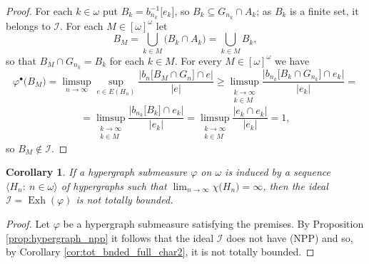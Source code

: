 \documentclass[a4paper,11pt,fleqn]{amsart}
\newtheorem{corollary}[theorem]{Corollary}
\theoremstyle{definition}
\theoremstyle{remark}
\numberwithin{equation}{section}
\newcommand{\N}{\mathbb{N}}
\newcommand{\iI}{\mathcal{I}}
\newcommand{\pP}{\mathcal{P}}
\DeclareMathOperator{\exh}{Exh}
\newcommand{\rstr}{\restriction}
\newcommand{\sm}{\setminus}
\newcommand{\sub}{\subseteq}
\newcommand{\seqn}[1]{\big\langle#1\colon\ n\io\big\rangle}
\newcommand{\ctblsub}[1]{\left[#1\right]^\omega}
\newcommand{\io}{\in\omega}%
\newcommand{\cso}{\ctblsub{\omega}}%
\begin{document}
\begin{proof}
    For each $k\io$ put $B_k=b_{n_k}^{-1}\big[e_k\big]$, so $B_k\sub G_{n_k}\cap A_k$; as $B_k$ is a finite set, it belongs to $\iI$. For each $M\in\cso$ let
    \[B_M=\bigcup_{k\in M}\big(B_k\cap A_k\big)=\bigcup_{k\in M}B_k,\]
    so that $B_M\cap G_{n_k}=B_k$ for each $k\in M$.
    For every $M\in\cso$ we have
    \[\varphi^\bullet\big(B_M\big)=\limsup_{n\to\infty}\sup_{e\in E(H_n)}\frac{\Big|b_n\big[B_M\cap G_n\big]\cap e\Big|}{|e|}\ge\limsup_{\substack{k\to\infty\\k\in M}}\frac{\Big|b_{n_k}\big[B_k\cap G_{n_k}\big]\cap e_k\Big|}{|e_k|}=\]
    \[=\limsup_{\substack{k\to\infty\\k\in M}}\frac{\big|b_{n_k}\big[B_k\big]\cap e_k\big|}{\big|e_k\big|}=\limsup_{\substack{k\to\infty\\k\in M}}\frac{\big|e_k\cap e_k\big|}{\big|e_k\big|}=1,\]
    so $B_M\not\in\iI$.%
\end{proof}

\begin{corollary}\label{cor:hypergraph_tot_bnd}
    If a hypergraph submeasure $\varphi$ on $\omega$ is induced by a sequence $\seqn{H_n}$ of hypergraphs such that $\lim_{n\to\infty}\chi\big(H_n\big)=\infty$, then the ideal $\iI=\exh(\varphi)$ is not totally bounded.
\end{corollary}
\begin{proof}
Let $\varphi$ be a hypergraph submeasure satisfying the premises. By Proposition \ref{prop:hypergraph_npp} it follows that the ideal $\iI$ does not have (NPP) and so, by Corollary \ref{cor:tot_bnded_full_char2}, it is not totally bounded.
\end{proof}
\end{document}
